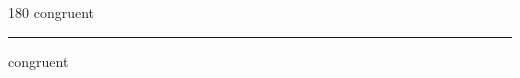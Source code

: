 
\begin{frame}
\begin{center}
\begin{turn}{180}
{\fontsize{2.5cm}{1em}\selectfont congruent}
\end{turn}
\vspace{1em}\par  
\hrule
\vspace{1em}\par  
{\fontsize{2.5cm}{1em}\selectfont congruent}
\end{center}
\end{frame}
